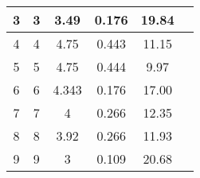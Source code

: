 \documentclass{article}
\begin{document}
\begin{table}[h]
\begin{tabular}{|c|c|c|c|c|c|}
3                                                    & 3                                                  & 3.49                                                            & 0.176                                                      & 19.84                                                             &                                                                    \\ \hline
4                                                    & 4                                                  & 4.75                                                            & 0.443                                                      & 11.15                                                             &                                                                    \\ \hline
5                                                    & 5                                                  & 4.75                                                            & 0.444                                                      & 9.97                                                              &                                                                    \\ \hline
6                                                    & 6                                                  & 4.343                                                           & 0.176                                                      & 17.00                                                             &                                                                    \\ \hline
7                                                    & 7                                                  & 4                                                               & 0.266                                                      & 12.35                                                             &                                                                    \\ \hline
8                                                    & 8                                                  & 3.92                                                            & 0.266                                                      & 11.93                                                             &                                                                    \\ \hline
9                                                    & 9                                                  & 3                                                               & 0.109                                                      & 20.68                                                             &                                                                    \\ \hline

\end{tabular}
\end{table}
\end{document}
